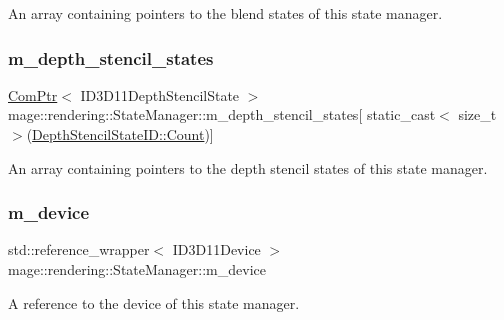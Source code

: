 An array containing pointers to the blend states of this state manager. \hypertarget{classmage_1_1rendering_1_1_state_manager_af5deff162f3f1d102091749bfbe205b6}{}\label{classmage_1_1rendering_1_1_state_manager_af5deff162f3f1d102091749bfbe205b6} 
\subsubsection{\texorpdfstring{m\+\_\+depth\+\_\+stencil\+\_\+states}{m\_depth\_stencil\_states}}
{\footnotesize\ttfamily \hyperlink{namespacemage_ae74f374780900893caa5555d1031fd79}{Com\+Ptr}$<$ I\+D3\+D11\+Depth\+Stencil\+State $>$ mage\+::rendering\+::\+State\+Manager\+::m\+\_\+depth\+\_\+stencil\+\_\+states\mbox{[} static\+\_\+cast$<$ size\+\_\+t $>$(\hyperlink{namespacemage_1_1rendering_ace195e7a068336e477080fce30f1329eae93f994f01c537c4e2f7d8528c3eb5e9}{Depth\+Stencil\+State\+I\+D\+::\+Count})\mbox{]}\hspace{0.3cm}{\ttfamily [private]}}

An array containing pointers to the depth stencil states of this state manager. \hypertarget{classmage_1_1rendering_1_1_state_manager_abfe78953d7404fc86e85531ac296281b}{}\label{classmage_1_1rendering_1_1_state_manager_abfe78953d7404fc86e85531ac296281b} 
\subsubsection{\texorpdfstring{m\+\_\+device}{m\_device}}
{\footnotesize\ttfamily std\+::reference\+\_\+wrapper$<$ I\+D3\+D11\+Device $>$ mage\+::rendering\+::\+State\+Manager\+::m\+\_\+device\hspace{0.3cm}{\ttfamily [private]}}

A reference to the device of this state manager. \hypertarget{classmage_1_1rendering_1_1_state_manager_a2d97d987062db0bf6d2f91c77ecb0655}{}\label{classmage_1_1rendering_1_1_state_manager_a2d97d987062db0bf6d2f91c77ecb0655} 
